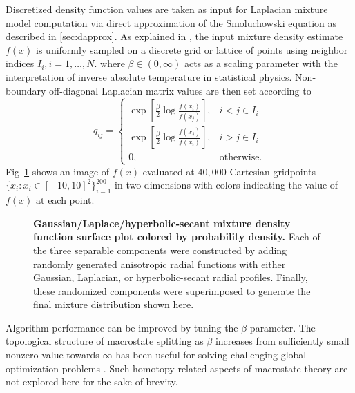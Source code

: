 \documentclass[10pt,letterpaper]{article}
\begin{document}
Discretized density function values are taken as input for Laplacian mixture model computation via direct approximation of the Smoluchowski equation as described in
\ref{sec:dapprox}. As explained in \cite{banush},  the input mixture density estimate $f(x)$ is uniformly sampled on a discrete grid or lattice of points using neighbor indices $I_i, i=1, \dots, N.$
where $\beta \in (0, \infty)$ acts as a scaling parameter with the interpretation of inverse absolute temperature in statistical physics.
Non-boundary off-diagonal Laplacian matrix values are then set according to
\begin{equation}
q_{ij} = \left\{
    \begin{array}{cc}
    \exp{\left[ \frac{\beta}{2}\log \frac{f(x_i)}{f(x_j)}\right]}, & i < j \in I_i \\
    \exp{\left[ \frac{\beta}{2} \log \frac{f(x_j)}{f(x_i)} \right] }, & i > j \in I_i \\
    0, & \mathrm{otherwise}.
    \end{array}
\right.
\end{equation} %
Fig~\ref{fig:8} shows an image of $f(x)$ evaluated at $40,000$ Cartesian gridpoints $\{x_i: x_i \in [-10, 10]^2\}_{i = 1}^{200}$ in two dimensions with colors
indicating the value of $f(x)$ at each point.
 \begin{figure}[!h]
 \caption{
 {\bf Gaussian/Laplace/hyperbolic-secant mixture density function surface plot colored by probability density.}
 Each of the three separable components were constructed by
 adding randomly generated anisotropic radial functions with either Gaussian, Laplacian, or hyperbolic-secant radial profiles. Finally, these randomized components were
 superimposed to generate the final mixture distribution shown here.}
 \label{fig:8}
 \end{figure}
Algorithm performance can be improved by tuning the $\beta$ parameter. The topological structure of macrostate splitting as $\beta$ increases from sufficiently small nonzero value towards $\infty$ has been useful for solving challenging global optimization problems \cite{pard}.
Such homotopy-related aspects of macrostate theory are not explored here for the sake of brevity.
\end{document}
